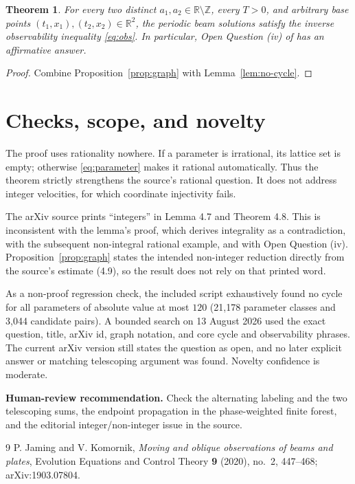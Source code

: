 \documentclass[11pt]{article}
\newtheorem{theorem}{Theorem}
\newcommand{\Z}{\mathbb Z}
\newcommand{\R}{\mathbb R}
\begin{document}
\begin{theorem}\label{thm:main}
For every two distinct $a_1,a_2\in\R\setminus\Z$, every $T>0$, and arbitrary
base points $(t_1,x_1),(t_2,x_2)\in\R^2$, the periodic beam solutions satisfy
the inverse observability inequality \eqref{eq:obs}.  In particular, Open
Question (iv) of \cite{JK} has an affirmative answer.
\end{theorem}

\begin{proof}
Combine Proposition~\ref{prop:graph} with Lemma~\ref{lem:no-cycle}.
\end{proof}

\section{Checks, scope, and novelty}

The proof uses rationality nowhere.  If a parameter is irrational, its lattice
set is empty; otherwise \eqref{eq:parameter} makes it rational automatically.
Thus the theorem strictly strengthens the source's rational question.  It
does not address integer velocities, for which coordinate injectivity fails.

The arXiv source prints ``integers'' in Lemma 4.7 and Theorem 4.8.  This is
inconsistent with the lemma's proof, which derives integrality as a
contradiction, with the subsequent non-integral rational example, and with
Open Question (iv).  Proposition~\ref{prop:graph} states the intended
non-integer reduction directly from the source's estimate (4.9), so the result
does not rely on that printed word.

As a non-proof regression check, the included script exhaustively found no
cycle for all parameters of absolute value at most $120$ (21,178 parameter
classes and 3,044 candidate pairs).  A bounded search on 13 August 2026 used
the exact question, title, arXiv id, graph notation, and core cycle and
observability phrases.  The current arXiv version still states the question as
open, and no later explicit answer or matching telescoping argument was found.
Novelty confidence is moderate.

\medskip
\noindent\textbf{Human-review recommendation.}
Check the alternating labeling and the two telescoping sums, the endpoint
propagation in the phase-weighted finite forest, and the editorial
integer/non-integer issue in the source.

\begin{thebibliography}{9}
P. Jaming and V. Komornik,
\emph{Moving and oblique observations of beams and plates},
Evolution Equations and Control Theory \textbf{9} (2020), no.~2, 447--468;
arXiv:1903.07804.
\end{thebibliography}
\end{document}
